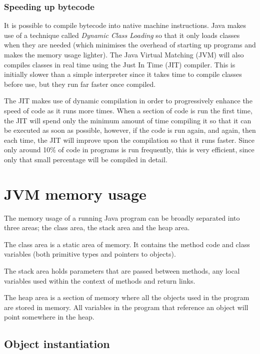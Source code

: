 \subsubsection{Speeding up bytecode}

It is possible to compile bytecode into native machine instructions. Java makes
use of a technique called {\it Dynamic Class Loading} so that it only loads
classes when they are needed (which minimises the overhead of starting up
programs and makes the memory usage lighter). The Java Virtual Matching (JVM)
will also compiles classes in real time using the Just In Time (JIT) compiler.
This is initially slower than a simple interpreter since it takes time to
compile classes before use, but they run far faster once compiled.

The JIT makes use of dynamic compilation in order to progressively enhance the
speed of code as it runs more times. When a section of code is run the first
time, the JIT will spend only the minimum amount of time compiling it so that it
can be executed as soon as possible, however, if the code is run again, and
again, then each time, the JIT will improve upon the compilation so that it runs
faster. Since only around 10\% of code in programs is run frequently, this is
very efficient, since only that small percentage will be compiled in detail.

\section{JVM memory usage}

The memory usage of a running Java program can be broadly separated into three
areas; the class area, the stack area and the heap area.

The class area is a static area of memory. It contains the method code and
class variables (both primitive types and pointers to objects).

The stack area holds parameters that are passed between methods, any local
variables used within the context of methods and return links.

The heap area is a section of memory where all the objects used in the program
are stored in memory. All variables in the program that reference an object
will point somewhere in the heap.

\subsection{Object instantiation}

